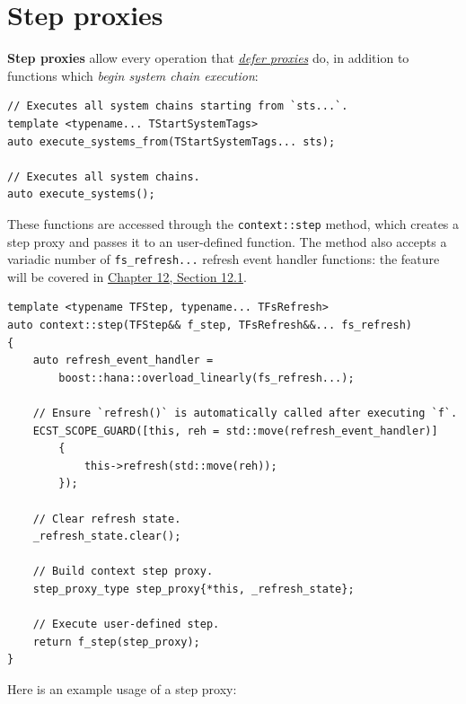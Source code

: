 \documentclass[twoside, 12pt, a4paper, openright]{book}
\begin{document}
\hypertarget{proxies_step}{\section{Step proxies}\label{proxies_step}}

\textbf{Step proxies} allow every operation that
\protect\hyperlink{proxies_defer}{\emph{defer proxies}} do, in addition
to functions which \emph{begin system chain execution}:

\begin{verbatim}
// Executes all system chains starting from `sts...`.
template <typename... TStartSystemTags>
auto execute_systems_from(TStartSystemTags... sts);

// Executes all system chains.
auto execute_systems();
\end{verbatim}

These functions are accessed through the
\texttt{context::step}
method, which creates a step proxy and passes it to an user-defined
function. The method also accepts a variadic number of
\texttt{fs_refresh...}
refresh event handler functions: the feature will be covered in
\protect\hyperlink{chap_advfeats}{Chapter 12, Section 12.1}.

\begin{verbatim}
template <typename TFStep, typename... TFsRefresh>
auto context::step(TFStep&& f_step, TFsRefresh&&... fs_refresh)
{
    auto refresh_event_handler =
        boost::hana::overload_linearly(fs_refresh...);

    // Ensure `refresh()` is automatically called after executing `f`.
    ECST_SCOPE_GUARD([this, reh = std::move(refresh_event_handler)]
        {
            this->refresh(std::move(reh));
        });

    // Clear refresh state.
    _refresh_state.clear();

    // Build context step proxy.
    step_proxy_type step_proxy{*this, _refresh_state};

    // Execute user-defined step.
    return f_step(step_proxy);
}
\end{verbatim}

Here is an example usage of a step proxy:
\end{document}
